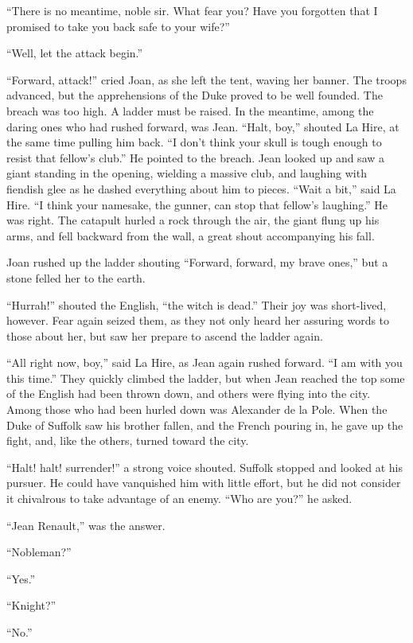 ``There is no meantime, noble sir. What fear you? Have you forgotten
that I promised to take you back safe to your wife?''

``Well, let the attack begin.''

``Forward, attack!'' cried Joan, as she left the tent, waving her
banner. The troops advanced, but the apprehensions of the Duke proved to
be well founded. The breach was too high. A ladder must be raised. In
the meantime, among the daring ones who had rushed forward, was Jean.
``Halt, boy,'' shouted La Hire, at the same time pulling him back. ``I
don't think your skull is tough enough to resist that fellow's club.''
He pointed to the breach. Jean looked up and saw a giant standing in the
opening, wielding a massive club, and laughing with fiendish glee as he
dashed everything about him to pieces. ``Wait a bit,'' said La Hire. ``I
think your namesake, the gunner, can stop that fellow's laughing.'' He
was right. The catapult hurled a rock through the air, the giant flung
up his arms, and fell backward from the wall, a great shout accompanying
his fall.

Joan rushed up the ladder shouting ``Forward, forward, my brave ones,''
but a stone felled her to the earth.

``Hurrah!'' shouted the English, ``the witch is dead.'' Their joy was
short-lived, however. Fear again seized them, as they not only heard her
assuring words to those about her, but saw her prepare to ascend the
ladder again.

``All right now, boy,'' said La Hire, as Jean again rushed forward. ``I
am with you this time.'' They quickly climbed the ladder, but when Jean
reached the top some of the English had been thrown down, and others
were flying into the city. Among those who had been hurled down was
Alexander de la Pole. When the Duke of Suffolk saw his brother fallen,
and the French pouring in, he gave up the fight, and, like the others,
turned toward the city.

``Halt! halt! surrender!'' a strong voice shouted. Suffolk stopped and
looked at his pursuer. He could have vanquished him with little effort,
but he did not consider it chivalrous to take advantage of an enemy.
``Who are you?'' he asked.

``Jean Renault,'' was the answer.

``Nobleman?''

``Yes.''

``Knight?''

``No.''

